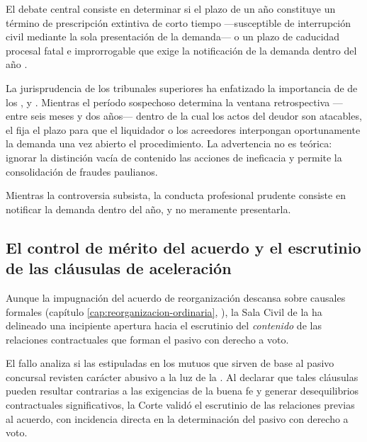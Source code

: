 El debate central consiste en determinar si el plazo de un año constituye un término de
prescripción extintiva de corto tiempo ---susceptible de interrupción civil mediante la sola
presentación de la demanda--- o un plazo de caducidad procesal fatal e improrrogable que exige
la notificación de la demanda dentro del año \parencite{doc-plazos-revocatorias}.

La jurisprudencia de los tribunales superiores ha enfatizado la importancia de  de
los ,  y . Mientras el período sospechoso determina la ventana
retrospectiva ---entre seis meses y dos años--- dentro de la cual los actos del deudor son
atacables, el  fija el plazo para que el liquidador o los acreedores interpongan
oportunamente la demanda una vez abierto el procedimiento. La advertencia no es teórica:
ignorar la distinción vacía de contenido las acciones de ineficacia y permite la consolidación
de fraudes paulianos.

\begin{alerta}
Mientras la controversia subsista, la conducta profesional prudente consiste en notificar la
demanda dentro del año, y no meramente presentarla.
\end{alerta}

\subsection{El control de mérito del acuerdo y el escrutinio de las cláusulas de aceleración}

Aunque la impugnación del acuerdo de reorganización descansa sobre causales formales
(capítulo \ref{cap:reorganizacion-ordinaria}, ), la Sala Civil de la \csup{} ha
delineado una incipiente apertura hacia el escrutinio del \emph{contenido} de las relaciones
contractuales que forman el pasivo con derecho a voto.

El fallo 
\parencite{juris-cs-34713-2023-santander} analiza si las 
estipuladas en los mutuos que sirven de base al pasivo concursal revisten carácter abusivo a
la luz de la . Al declarar
que tales cláusulas pueden resultar contrarias a las exigencias de la buena fe y generar
desequilibrios contractuales significativos, la Corte validó el escrutinio de las relaciones
previas al acuerdo, con incidencia directa en la determinación del pasivo con derecho a voto.

